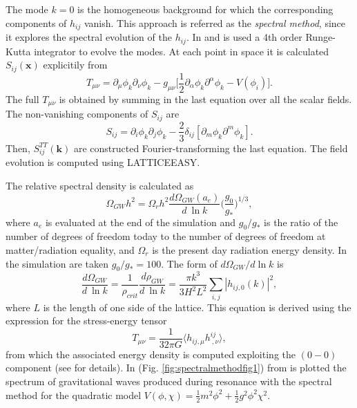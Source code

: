 \documentclass[11pt,a4paper,twoside]{book}
\begin{document}
The mode $ k=0 $ is the homogeneous background for which the corresponding components of $ h_{ij} $ vanish. This approach is referred as the \textit{spectral method}, since it explores the spectral evolution of the $ h_{ij} $. In \cite{Chap7:SpectralMethod} and \cite{Chap7:SpectralMethodComparison} is used a 4th order Runge-Kutta integrator to evolve the modes. At each point in space it is calculated $ S_{ij}(\textbf{x}) $ explicitily from
\begin{equation}
\label{Chap7:SpectralMethod_StressEnergyTensor}
T_{\mu\nu}=\partial_{\mu}\phi_{k}\partial_{\nu}\phi_{k} - g_{\mu\nu}\Bigg[\frac{1}{2}\partial_{\alpha}\phi_{k}\partial^{\alpha}\phi_{k} - V(\phi_{i})\Bigg].
\end{equation}
The full $ T_{\mu\nu} $ is obtained by summing in the last equation over all the scalar fields. The non-vanishing components of $ S_{ij} $ are 
\begin{equation}
\label{Chap7:SijNonVanishingComponent}
S_{ij}=\partial_{i}\phi_{k}\partial_{j}\phi_{k} - \frac{2}{3}\delta_{ij}[\partial_{m}\phi_{k}\partial^{m}\phi_{k}].
\end{equation}
Then, $ S^{TT}_{ij}(\textbf{k}) $ are constructed Fourier-transforming the last equation. The field evolution is computed using LATTICEEASY.

The relative spectral density is calculated as
\begin{equation}
\label{Chap7:spectralDensity}
\Omega_{GW}h^{2} = \Omega_{r}h^{2}\frac{d\Omega_{GW}(a_{e})}{d\ \ln k}\Bigg(\frac{g_{0}}{g_{*}}\Bigg)^{1/3},
\end{equation} 
where $ a_{e} $ is evaluated at the end of the simulation and $ g_{0}/g_{*} $ is the ratio of the number of degrees of freedom today to the number of degrees of freedom at matter/radiation equality, and $ \Omega_{r} $ is the present day radiation energy density. In the simulation are taken $ g_{0}/g_{*}=100 $. The form of $d\Omega_{GW}/d \ln k  $ is 
\begin{equation}
\label{Chap7:SpectralDensity}
\frac{d \Omega_{GW}}{d\ \ln k}=\frac{1}{\rho_{crit}}\frac{d\rho_{GW}}{d\ \ln k}=\frac{\pi k^{3}}{3H^{2}L^{2}}\sum_{i,j}|h_{ij,0}(k)|^{2},
\end{equation}
where $ L $ is the length of one side of the lattice. This equation is derived using the expression for the stress-energy tensor
\begin{equation}
\label{Chap7:StressEnergyTensorSpectralMethod}
T_{\mu\nu}=\frac{1}{32\pi G}\langle h_{ij,\mu}h^{ij}_{\ ,\nu}\rangle ,
\end{equation}
from which the associated energy density is computed exploiting the $ (0-0) $ component (see \cite{Chap7:SpectralMethodComparison} for details). In (Fig. \ref{fig:spectralmethodfig1}) from \cite{Chap7:SpectralMethod} is plotted the spectrum of gravitational waves produced during resonance with the spectral method for the quadratic  model $ V(\phi,\chi)=\frac{1}{2}m^{2}\phi^{2} + \frac{1}{2}g^{2}\phi^{2}\chi^{2} $.
\end{document}
